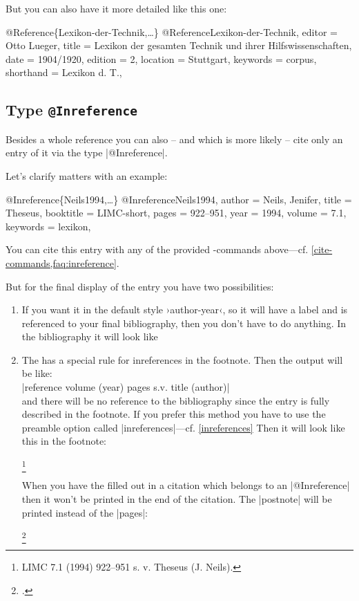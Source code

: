 \documentclass[a4paper,
10pt,
greek,
french,
spanish,
italian,
ngerman,
english
]{ltxdoc}
\begin{document}
But you can also have it  more detailed  like this one:
\begin{bibexample}[label=Lexikon-der-Technik]{{@}Reference\{Lexikon-der-Technik,…\}}
@Reference{Lexikon-der-Technik,
  editor    = {Otto Lueger},
  title     = {Lexikon der gesamten Technik und ihrer Hilfswissenschaften},
  date      = {1904/1920},
  edition   = {2},
  location  = Stuttgart,   %
  keywords  = {corpus},
  shorthand = {Lexikon d. T.},
}
\end{bibexample}

 \subsection{Type \texttt{@Inreference}}\label{inreference}
Besides a whole reference you can also -- and which is more likely -- cite only an entry of it via the type  |@Inreference|.

Let’s clarify matters with an example:
\begin{bibexample}[label=Neils1994]{{@}Inreference\{Neils1994,…\}}
@Inreference{Neils1994,
  author    = {Neils, Jenifer},
  title     = {Theseus},
  booktitle = LIMC-short,    %
  pages     = {922--951},
  year      = {1994},
  volume    = {7.1},
  keywords  = {lexikon},
}
\end{bibexample}
You can cite this entry with any of the provided -commands above---cf. \cref{cite-commands,faq:inreference}.

But for the final display of the entry  you have two possibilities:
 \begin{enumerate}
\item\label{inreference:a} 

If you want it in the default style ›author-year‹, so it will have a label and is referenced 
to your final bibliography, then you don’t have to do anything.
In the bibliography it will look like

\item\label{inreference:b} 
The \DAI has a special rule for inreferences in the footnote.
Then the output will be like:\\
|reference volume (year) pages s.v. title (author)| \\
and there will be no reference to the bibliography since the entry is fully described in the footnote.
 If you prefer this method you have to use the preamble option called  |inreferences|---cf. \cref{inreferences}
Then it will look like this in the footnote:
\begin{examplemanual}
\footnote{LIMC 7.1 (1994) 922--951 s. v. Theseus (J. Neils).}
\end{examplemanual}
When you have the  filled out in a citation which belongs to an |@Inreference| then it won’t be printed in the end of the citation.
The |postnote|  will be printed instead of the |pages|:
\begin{example}
\footnote{\cite[vgl.][930 Nr. 283]{Neils1994}.}
\end{example} 
\end{enumerate}
\end{document}
